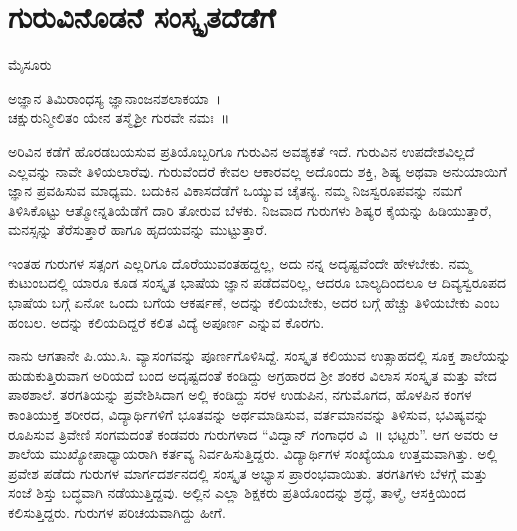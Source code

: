 {\fontsize{14}{16}\selectfont
\chapter{ಗುರುವಿನೊಡನೆ ಸಂಸ್ಕೃತದೆಡೆಗೆ}

\begin{center}
\smallskip

ಮೈಸೂರು
\addrule
\end{center}

\begin{center}
ಅಜ್ಞಾನ ತಿಮಿರಾಂಧಸ್ಯ ಜ್ಞಾನಾಂಜನಶಲಾಕಯಾ~।\\
ಚಕ್ಷುರುನ್ಮೀಲಿತಂ ಯೇನ ತಸ್ಮೈಶ್ರೀ ಗುರವೇ ನಮಃ~॥
\end{center}
ಅರಿವಿನ ಕಡೆಗೆ ಹೊರಡಬಯಸುವ ಪ್ರತಿಯೊಬ್ಬರಿಗೂ ಗುರುವಿನ ಅವಶ್ಯಕತೆ ಇದೆ. ಗುರುವಿನ ಉಪದೇಶವಿಲ್ಲದೆ ಎಲ್ಲವನ್ನು ನಾವೇ ತಿಳಿಯಲಾರೆವು. ಗುರುವೆಂದರೆ ಕೇವಲ ಆಕಾರವಲ್ಲ ಅದೊಂದು ಶಕ್ತಿ, ಶಿಷ್ಯ ಅಥವಾ ಅನುಯಾಯಿಗೆ ಜ್ಞಾನ ಪ್ರವಹಿಸುವ ಮಾಧ್ಯಮ. ಬದುಕಿನ ವಿಕಾಸದೆಡೆಗೆ ಒಯ್ಯುವ ಚೈತನ್ಯ. ನಮ್ಮ ನಿಜಸ್ವರೂಪವನ್ನು ನಮಗೆ ತಿಳಿಸಿಕೊಟ್ಟು ಆತ್ಮೋನ್ನತಿಯೆಡೆಗೆ ದಾರಿ ತೋರುವ ಬೆಳಕು. ನಿಜವಾದ ಗುರುಗಳು ಶಿಷ್ಯರ ಕೈಯನ್ನು ಹಿಡಿಯುತ್ತಾರೆ, ಮನಸ್ಸನ್ನು ತೆರೆಸುತ್ತಾರೆ ಹಾಗೂ ಹೃದಯವನ್ನು ಮುಟ್ಟುತ್ತಾರೆ.

ಇಂತಹ ಗುರುಗಳ ಸತ್ಸಂಗ ಎಲ್ಲರಿಗೂ ದೊರೆಯುವಂತಹದ್ದಲ್ಲ, ಅದು ನನ್ನ ಅದೃಷ್ಟವೆಂದೇ ಹೇಳಬೇಕು. ನಮ್ಮ ಕುಟುಂಬದಲ್ಲಿ ಯಾರೂ ಕೂಡ ಸಂಸ್ಕೃತ ಭಾಷೆಯ ಜ್ಞಾನ ಪಡೆದವರಿಲ್ಲ, ಆದರೂ ಬಾಲ್ಯದಿಂದಲೂ ಆ ದಿವ್ಯಸ್ವರೂಪದ ಭಾಷೆಯ ಬಗ್ಗೆ ಏನೋ ಒಂದು ಬಗೆಯ ಆಕರ್ಷಣೆ, ಅದನ್ನು ಕಲಿಯಬೇಕು, ಅದರ ಬಗ್ಗೆ ಹೆಚ್ಚು ತಿಳಿಯಬೇಕು ಎಂಬ ಹಂಬಲ. ಅದನ್ನು ಕಲಿಯದಿದ್ದರೆ ಕಲಿತ ವಿದ್ಯೆ ಅಪೂರ್ಣ ಎನ್ನುವ ಕೊರಗು. 

ನಾನು ಆಗತಾನೇ ಪಿ.ಯು.ಸಿ. ವ್ಯಾಸಂಗವನ್ನು ಪೂರ್ಣಗೊಳಿಸಿದ್ದೆ. ಸಂಸ್ಕೃತ ಕಲಿಯುವ ಉತ್ಸಾಹದಲ್ಲಿ ಸೂಕ್ತ ಶಾಲೆಯನ್ನು ಹುಡುಕುತ್ತಿರುವಾಗ ಅರಿಯದೆ ಬಂದ ಅದೃಷ್ಟದಂತೆ ಕಂಡಿದ್ದು ಅಗ್ರಹಾರದ ಶ್ರೀ ಶಂಕರ ವಿಲಾಸ ಸಂಸ್ಕೃತ ಮತ್ತು ವೇದ ಪಾಠಶಾಲೆ. ತರಗತಿಯನ್ನು ಪ್ರವೇಶಿಸಿದಾಗ ಅಲ್ಲಿ ಕಂಡಿದ್ದು ಸರಳ ಉಡುಪಿನ, ನಗುಮೊಗದ, ಹೊಳಪಿನ ಕಂಗಳ ಕಾಂತಿಯುಕ್ತ ಶರೀರದ, ವಿದ್ಯಾರ್ಥಿಗಳಿಗೆ ಭೂತವನ್ನು ಅರ್ಥಮಾಡಿಸುವ, ವರ್ತಮಾನವನ್ನು ತಿಳಿಸುವ, ಭವಿಷ್ಯವನ್ನು ರೂಪಿಸುವ ತ್ರಿವೇಣಿ ಸಂಗಮದಂತೆ ಕಂಡವರು ಗುರುಗಳಾದ “ವಿದ್ವಾನ್ ಗಂಗಾಧರ ವಿ~॥ ಭಟ್ಟರು”. ಆಗ ಅವರು ಆ ಶಾಲೆಯ ಮುಖ್ಯೋಪಾಧ್ಯಾಯರಾಗಿ ಕರ್ತವ್ಯ ನಿರ್ವಹಿಸುತ್ತಿದ್ದರು. ವಿದ್ಯಾರ್ಥಿಗಳ ಸಂಖ್ಯೆಯೂ ಉತ್ತಮವಾಗಿತ್ತು. ಅಲ್ಲಿ ಪ್ರವೇಶ ಪಡೆದು ಗುರುಗಳ ಮಾರ್ಗದರ್ಶನದಲ್ಲಿ ಸಂಸ್ಕೃತ ಅಭ್ಯಾಸ ಪ್ರಾರಂಭವಾಯಿತು. ತರಗತಿಗಳು ಬೆಳಗ್ಗೆ ಮತ್ತು ಸಂಜೆ ಶಿಸ್ತು ಬದ್ಧವಾಗಿ ನಡೆಯುತ್ತಿದ್ದವು. ಅಲ್ಲಿನ ಎಲ್ಲಾ ಶಿಕ್ಷಕರು ಪ್ರತಿಯೊಂದನ್ನು ಶ್ರದ್ಧೆ, ತಾಳ್ಮೆ, ಆಸಕ್ತಿಯಿಂದ ಕಲಿಸುತ್ತಿದ್ದರು. ಗುರುಗಳ ಪರಿಚಯವಾಗಿದ್ದು ಹೀಗೆ.

}
